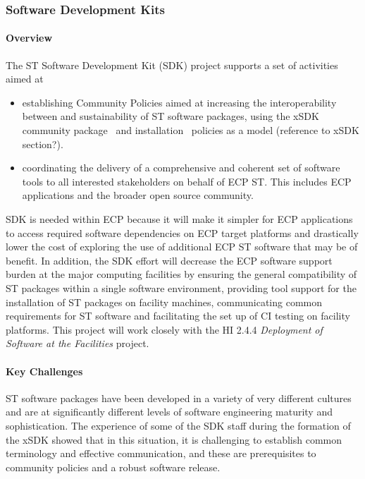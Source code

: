 \subsubsection{ Software Development Kits} \label{subsubsect:ecosystem-sdk}

\paragraph{Overview} The ST Software Development Kit (SDK) project supports a set of activities aimed at

\begin{itemize}
\item establishing Community Policies aimed at increasing the interoperability between and sustainability of ST software packages, using the xSDK community package~\cite{xSDK-community-package-policies2016} and installation~\cite{xSDK-community-installation-policies2016} policies as a model (reference to xSDK section?).

\item coordinating the delivery of a comprehensive and coherent set of software tools to all interested stakeholders on behalf of ECP ST. This includes ECP applications and the broader open source community.

\end{itemize}

SDK is needed within ECP because it will make it simpler for ECP applications to access required software dependencies on ECP target platforms and drastically lower the cost of exploring the use of additional ECP ST software that may be of benefit. In addition, the SDK effort will decrease the ECP software support burden at the major computing facilities by ensuring the general compatibility of ST packages within a single software environment, providing tool support for the installation of ST packages on facility machines, communicating common requirements for ST software and facilitating the set up of CI testing on facility platforms. This project will work closely with the HI 2.4.4 \textit{Deployment of Software at the Facilities} project.

\paragraph{Key  Challenges}
ST software packages have been developed in a variety of very different cultures and are at significantly different levels of software engineering maturity and sophistication. The experience of some of the SDK staff during the formation of the xSDK showed that in this situation, it is challenging to establish common terminology and effective communication, and these are prerequisites to community policies and a robust software release.

